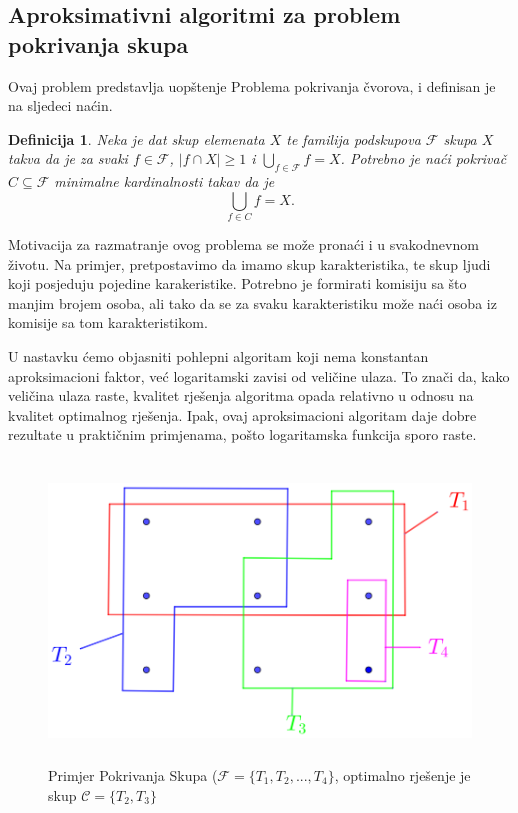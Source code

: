 \documentclass[a4paper, utf8, 11pt, colorlinks]{book}
\newtheorem{definition}{Definicija}[chapter]
\theoremstyle{definition}
\begin{document}
 \subsection{Aproksimativni algoritmi za problem pokrivanja skupa}
Ovaj problem predstavlja uopštenje Problema pokrivanja čvorova, i definisan je na sljedeci naćin.
\begin{definition}
    Neka je dat skup elemenata $X$ te familija podskupova $\mathcal{F}$ skupa $X$ takva da je za svaki $f\in \mathcal{F}$, $|f \cap X| \geq 1$ i $\bigcup_{f \in \mathcal{F}} f = X$. 
	    Potrebno je naći pokrivač $C \subseteq \mathcal{F}$ minimalne kardinalnosti takav da je 
	    $$ \bigcup_{f \in C} f = X.$$
\end{definition}


Motivacija za razmatranje ovog problema se može pronaći i u svakodnevnom životu. Na primjer, pretpostavimo da imamo skup karakteristika, te skup ljudi koji posjeduju pojedine karakeristike. Potrebno je formirati komisiju sa što manjim brojem osoba, ali tako da se za svaku karakteristiku može naći osoba iz komisije sa tom karakteristikom.
 

 U nastavku ćemo objasniti pohlepni algoritam koji nema konstantan aproksimacioni faktor, već logaritamski zavisi od veličine ulaza. To znači da, kako veličina ulaza raste, kvalitet rješenja algoritma opada relativno u odnosu na kvalitet optimalnog rješenja. Ipak,  ovaj aproksimacioni algoritam  daje dobre rezultate u praktičnim primjenama, pošto logaritamska funkcija sporo raste.

\begin{figure}
	\centering
	\includegraphics[width=120mm, height=80mm]{set-cover-1.eps}
	\caption{Primjer Pokrivanja Skupa ($\mathcal{F}=\{T_1,T_2,...,T_4\}$, optimalno rješenje je skup $\mathcal{C}=\{T_2, T_3\}$}
	 \label{fig:set-cover-1}
\end{figure}
 
\end{document}
